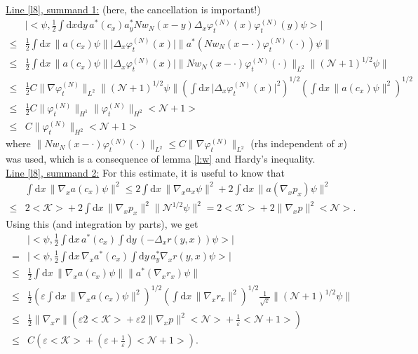\documentclass[11pt,a4paper]{scrartcl}
\newcommand{\di}{\textrm{d}}		%
\newcommand{\Ncal}{\mathcal{N}}		%
\newcommand{\Kcal}{\mathcal{K}}		%
\newcommand{\estlist}[2]{\underline{Line \ref{l#1}, summand #2:}}
\newcommand{\scal}[2]{\big<#1,#2\big>} %
\newcommand{\norm}[1]{\lVert#1\rVert}	%
\newcommand{\ev}[1]{\big<#1\big>}	%
\newcommand{\ph}{\varphi_t^{(N)}}	%
\begin{document}
\estlist{8}{1} (here, the cancellation is important!)
\begin{align*}
&\lvert \scal{\psi}{\frac{1}{2}\int \di x\di y\,a^\ast(c_x) a^\ast_y N w_N(x-y) \Delta_x \ph(x) \ph(y) \psi}\rvert\\
\leq & \frac{1}{2} \int \di x\, \norm{a(c_x)\psi} \lvert \Delta_x \ph(x)\rvert \norm{a^\ast(Nw_N(x-\cdot)\ph(\cdot))\psi} \\
\leq & \frac{1}{2} \int \di x\, \norm{a(c_x)\psi} \lvert \Delta_x \ph(x)\rvert \norm{N w_N(x-\cdot)\ph(\cdot)}_{L^2} \norm{(\Ncal+1)^{1/2}\psi} \\
\leq & \frac{1}{2} C \norm{\nabla\ph}_{L^2} \norm{(\Ncal+1)^{1/2} \psi} \left( \int \di x\, \lvert \Delta_x \ph(x)\rvert^2 \right)^{1/2} \left( \int \di x\, \norm{a(c_x)\psi}^2 \right)^{1/2} \\
\leq & \frac{1}{2} C \norm{\ph}_{H^1} \norm{\ph}_{H^2} \ev{\Ncal+1} \\
\leq & C \norm{\ph}_{H^2} \ev{\Ncal+1}
\end{align*}
where $\norm{Nw_N(x-\cdot)\ph(\cdot)}_{L^2} \leq C\norm{\nabla \ph}_{L^2}$ (rhs independent of $x$) was used, which is a consequence of lemma \ref{l:w} and Hardy's inequality.\\
\estlist{8}{2}
For this estimate, it is useful to know that
\begin{align*}
 & \int \di x\, \norm{\nabla_x a(c_x)\psi}^2 \leq 2 \int \di x\, \norm{\nabla_x a_x \psi}^2 + 2\int \di x\, \norm{a(\nabla_x p_x)\psi}^2 \\
 \leq & 2\ev{\Kcal} + 2\int \di x\, \norm{\nabla_x p_x}^2 \norm{\Ncal^{1/2}\psi}^2 = 2\ev{\Kcal}+ 2\norm{\nabla_x p}^2 \ev{\Ncal}.
\end{align*}
Using this (and integration by parts), we get
\begin{align*}
 & \lvert \scal{\psi}{\frac{1}{2}\int \di x\, a^\ast(c_x) \int \di y\, (-\Delta_x r(y,x))\psi} \rvert \\
= & \lvert \scal{\psi}{\frac{1}{2}\int \di x\, \nabla_x a^\ast(c_x) \int \di y\, a^\ast_y \nabla_x r(y,x) \psi}\rvert \\
\leq & \frac{1}{2}\int \di x\, \norm{\nabla_x a(c_x)\psi} \norm{a^\ast(\nabla_x r_x)\psi} \\
\leq & \frac{1}{2}\left( \varepsilon \int \di x\, \norm{\nabla_x a(c_x) \psi}^2 \right)^{1/2} \left( \int \di x\, \norm{\nabla_x r_x}^2 \right)^{1/2} \frac{1}{\sqrt{\varepsilon}} \norm{(\Ncal+1)^{1/2}\psi} \\
\leq & \frac{1}{2}\norm{\nabla_x r} \left( \varepsilon 2\ev{\Kcal} + \varepsilon 2 \norm{\nabla_x p}^2 \ev{\Ncal} + \frac{1}{\varepsilon}\ev{\Ncal+1} \right) \\
\leq & C \left( \varepsilon \ev{\Kcal} + (\varepsilon+\frac{1}{\varepsilon})\ev{\Ncal+1} \right).
\end{align*}
\end{document}

